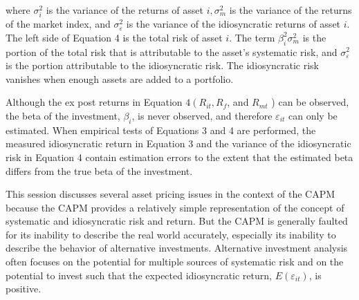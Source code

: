\documentclass[11pt]{article}
\begin{document}
where $\sigma_{i}^{2}$ is the variance of the returns of asset $i, \sigma_{m}^{2}$ is the variance of the returns of the market index, and $\sigma_{\varepsilon}^{2}$ is the variance of the idiosyncratic returns of asset $i$. The left side of Equation 4 is the total risk of asset $i$. The term $\beta_{i}^{2} \sigma_{m}^{2}$ is the portion of the total risk that is attributable to the asset's systematic risk, and $\sigma_{\varepsilon}^{2}$ is the portion attributable to the idiosyncratic risk. The idiosyncratic risk vanishes when enough assets are added to a portfolio.

Although the ex post returns in Equation $4\left(R_{i t}, R_{f}\right.$, and $R_{m t}$ ) can be observed, the beta of the investment, $\beta_{i}$, is never observed, and therefore $\varepsilon_{i t}$ can only be estimated. When empirical tests of Equations 3 and 4 are performed, the measured idiosyncratic return in Equation 3 and the variance of the idiosyncratic risk in Equation 4 contain estimation errors to the extent that the estimated beta differs from the true beta of the investment.

This session discusses several asset pricing issues in the context of the CAPM because the CAPM provides a relatively simple representation of the concept of systematic and idiosyncratic risk and return. But the CAPM is generally faulted for its inability to describe the real world accurately, especially its inability to describe the behavior of alternative investments. Alternative investment analysis often focuses on the potential for multiple sources of systematic risk and on the potential to invest such that the expected idiosyncratic return, $E\left(\varepsilon_{i t}\right)$, is positive.
\end{document}
